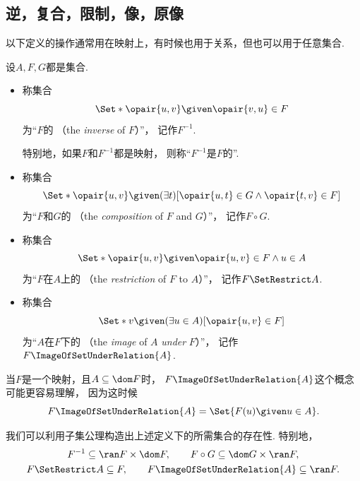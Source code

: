 \subsection{逆，复合，限制，像，原像}
以下定义的操作通常用在映射上，有时候也用于关系，但也可以用于任意集合.
\begin{definition}\label{definition:映射.逆-复合-限制-像}
设\(A,F,G\)都是集合.
\begin{itemize}
	\item 称集合\begin{equation*}
		\Set*{ \opair{u,v} \given \opair{v,u} \in F }
	\end{equation*}为“\(F\)的%
	（the \emph{inverse} of \(F\)）”，
	记作\(F^{-1}\).

	特别地，如果\(F\)和\(F^{-1}\)都是映射，
	则称“\(F^{-1}\)是\(F\)的”.

	\item 称集合\begin{equation*}
		\Set*{ \opair{u,v} \given (\exists t)[\opair{u,t} \in G \land \opair{t,v} \in F] }
	\end{equation*}为“\(F\)和\(G\)的%
	（the \emph{composition} of \(F\) and \(G\)）”，
	记作\(F \circ G\).

	\item 称集合\begin{equation*}
		\Set*{ \opair{u,v} \given \opair{u,v} \in F \land u \in A }
	\end{equation*}为“\(F\)在\(A\)上的%
	（the \emph{restriction} of \(F\) to \(A\)）”，
	记作\(F \SetRestrict A\).

	\item 称集合\begin{equation*}
		\Set*{ v \given (\exists u \in A)[\opair{u,v} \in F] }
	\end{equation*}为“\(A\)在\(F\)下的%
	（the \emph{image} of \(A\) \emph{under} \(F\)）”，
	记作\(F\ImageOfSetUnderRelation{A}\).
\end{itemize}
\end{definition}

当\(F\)是一个映射，且\(A \subseteq \dom F\)时，
\(F\ImageOfSetUnderRelation{A}\)这个概念可能更容易理解，
因为这时候\begin{equation*}
	F\ImageOfSetUnderRelation{A}
	= \Set{ F(u) \given u \in A }.
\end{equation*}

我们可以利用子集公理构造出上述定义下的所需集合的存在性.
特别地，\begin{gather*}
	F^{-1} \subseteq \ran F \times \dom F, \qquad
	F \circ G \subseteq \dom G \times \ran F, \\
	F \SetRestrict A \subseteq F, \qquad
	F\ImageOfSetUnderRelation{A} \subseteq \ran F.
\end{gather*}


